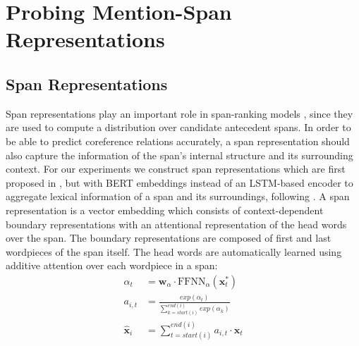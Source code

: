 \documentclass[11pt]{article}
\begin{document}
\section{Probing Mention-Span Representations}


\subsection{Span Representations}
\label{subsection:spanreps}

Span representations play an important role in span-ranking models \parencite{lee2017end,lee2018higher,joshi2019coref}, since they are used to compute a distribution over candidate antecedent spans. In order to be able to predict coreference relations accurately, a span representation should also capture the information of the span's internal structure and its surrounding context. For our experiments we construct span representations which are first proposed in \textcite{lee2017end}, but with BERT embeddings \parencite{devlin2019bert} instead of an LSTM-based encoder to aggregate lexical information of a span and its surroundings, following \textcite{joshi2019coref}. A span representation is a vector embedding which consists of context-dependent boundary representations with an attentional representation of the head words over the span. The boundary representations are composed of first and last wordpieces of the span itself. The head words are automatically learned using additive attention \parencite{bahdanau} over each wordpiece in a span: 
\begin{align}
\alpha_{t} &= \pmb{w}_{\alpha} \cdot \text{FFNN}_{\alpha}(\pmb{x}_{t}^{*}) \\ 
a_{i,t} &=  \frac{exp(\alpha_{t})}{\sum\limits_{k=start(i)}^{end(i)} exp(\alpha_{k})} \\ 
\hat{\pmb{x}}_{i} &= \sum\limits_{t=start(i)}^{end(i)} a_{i,t} \cdot \pmb{x}_{t}
\end{align}
\end{document}
